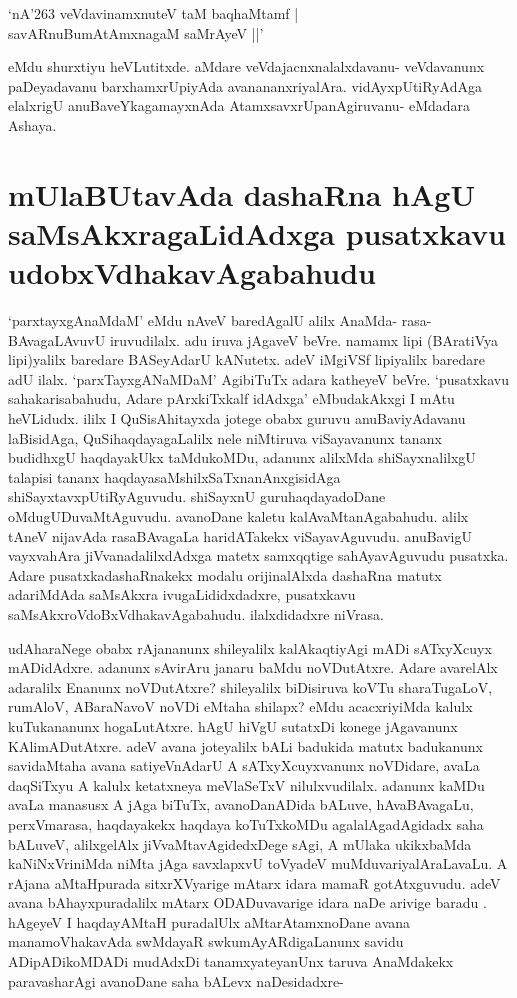 \begin{shloka}
`nA\char'263 veVdavinamxnuteV taM baqhaMtamf |\label{106}\\
savARnuBumAtAmxnagaM saMrAyeV ||'
\end{shloka}
eMdu shurxtiyu heVLutitxde. aMdare veVdajacnxnalalxdavanu- veVdavanunx paDeyadavanu barxhamxrUpiyAda avanananxriyalAra. vidAyxpUtiRyAdAga elalxrigU anuBaveYkagamayxnAda AtamxsavxrUpanAgiruvanu- eMdadara Ashaya.

\section*{mUlaBUtavAda dashaRna hAgU saMsAkxragaLidAdxga pusatxkavu udobxVdhakavAgabahudu}

`parxtayxgAnaMdaM' eMdu nAveV baredAgalU alilx AnaMda- rasa- BAvagaLAvuvU iruvudilalx. adu iruva jAgaveV beVre. namamx lipi (BAratiVya lipi)yalilx baredare BASeyAdarU kANutetx. adeV iMgiVSf lipiyalilx baredare adU ilalx. `parxTayxgANaMDaM' AgibiTuTx  adara katheyeV beVre. `pusatxkavu sahakarisabahudu, Adare pArxkiTxkalf idAdxga' eMbudakAkxgi I mAtu heVLidudx. ililx I QuSisAhitayxda jotege obabx guruvu anuBaviyAdavanu laBisidAga, QuSihaqdayagaLalilx nele niMtiruva viSayavanunx tananx budidhxgU haqdayakUkx taMdukoMDu, adanunx alilxMda shiSayxnalilxgU talapisi tananx haqdayasaMshilxSaTxnanAnxgisidAga shiSayxtavxpUtiRyAguvudu. shiSayxnU guruhaqdayadoDane oMdugUDuvaMtAguvudu. avanoDane kaletu kalAvaMtanAgabahudu. alilx tAneV nijavAda rasaBAvagaLa haridATakekx viSayavAguvudu. anuBavigU vayxvahAra jiVvanadalilxdAdxga matetx samxqqtige sahAyavAguvudu pusatxka. Adare pusatxkadashaRnakekx modalu orijinalAlxda dashaRna matutx adariMdAda saMsAkxra ivugaLididxdadxre, pusatxkavu saMsAkxroVdoBxVdhakavAgabahudu. ilalxdidadxre niVrasa.

udAharaNege obabx rAjananunx shileyalilx kalAkaqtiyAgi mADi sATxyXcuyx mADidAdxre. adanunx sAvirAru janaru baMdu noVDutAtxre. Adare avarelAlx adaralilx Enanunx noVDutAtxre? shileyalilx biDisiruva koVTu sharaTugaLoV, rumAloV, ABaraNavoV noVDi eMtaha shilapx? eMdu acacxriyiMda kalulx kuTukananunx hogaLutAtxre. hAgU hiVgU sutatxDi konege jAgavanunx KAlimADutAtxre. adeV avana joteyalilx bALi badukida matutx badukanunx savidaMtaha avana satiyeVnAdarU A sATxyXcuyxvanunx noVDidare, avaLa daqSiTxyu A kalulx ketatxneya meVlaSeTxV nilulxvudilalx. adanunx kaMDu avaLa manasusx A jAga biTuTx, avanoDanADida bALuve, hAvaBAvagaLu, perxVmarasa, haqdayakekx haqdaya koTuTxkoMDu agalalAgadAgidadx saha bALuveV, alilxgelAlx jiVvaMtavAgidedxDege sAgi, A mUlaka ukikxbaMda kaNiNxVriniMda niMta jAga savxlapxvU toVyadeV muMduvariyalAraLavaLu. A rAjana aMtaHpurada sitxrXVyarige mAtarx idara mamaR gotAtxguvudu. adeV avana bAhayxpuradalilx mAtarx ODADuvavarige idara naDe arivige baradu . hAgeyeV I haqdayAMtaH puradalUlx aMtarAtamxnoDane avana manamoVhakavAda swMdayaR swkumAyARdigaLanunx savidu ADipADikoMDADi mudAdxDi tanamxyateyanUnx taruva AnaMdakekx paravasharAgi avanoDane saha bALevx naDesidadxre-

